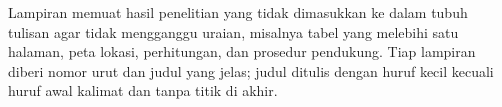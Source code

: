 Lampiran memuat hasil penelitian yang tidak dimasukkan ke dalam tubuh tulisan agar tidak mengganggu uraian, misalnya tabel yang melebihi satu halaman, peta lokasi, perhitungan, dan prosedur pendukung. Tiap lampiran diberi nomor urut dan judul yang jelas; judul ditulis dengan huruf kecil kecuali huruf awal kalimat dan tanpa titik di akhir.

